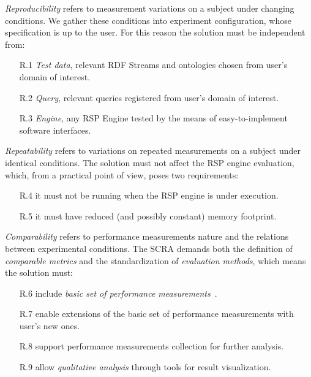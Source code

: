 \textit{Reproducibility} refers to measurement variations on a subject under changing conditions. We gather these conditions into experiment configuration, whose specification is up to the user. For this reason the solution must be independent from:
\begin{enumerate}
\item[R.1] \textit{Test data}, relevant RDF Streams and ontologies chosen from user's domain of interest. %
\item[R.2] \textit{Query}, relevant queries registered from user's domain of interest.
\item[R.3] \textit{Engine}, any RSP Engine tested by the means of easy-to-implement software interfaces. 
\end{enumerate}

\textit{Repeatability} refers to variations on repeated measurements on a subject under identical conditions. The solution must not affect the RSP engine evaluation, which, from a practical point of view, poses two requirements:
\begin{enumerate}
\item[R.4] it must not be running when the RSP engine is under execution. %
\item[R.5] it must have reduced (and possibly constant) memory footprint. %
\end{enumerate}

\textit{Comparability} refers to performance measurements nature and the relations between experimental conditions. The SCRA demands both the definition of \textit{comparable metrics} and the standardization of \textit{evaluation methods}, which means the solution must:
\begin{enumerate}
\item[R.6] include \textit{basic set of performance measurements}~\cite{DBLP:conf/esws/ScharrenbachUMVB13}.
\item[R.7] enable extensions of the basic set of performance measurements with user's new ones.
\item[R.8] support performance measurements collection for further analysis.
\item[R.9] allow \textit{qualitative analysis} through tools for result visualization.
\end{enumerate}

